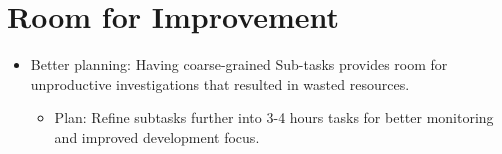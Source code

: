 \documentclass{article}
\begin{document}
\section*{Room for Improvement}

\begin{itemize}
   \item Better planning: Having coarse-grained Sub-tasks provides room for unproductive investigations that resulted in wasted resources.
      \begin{itemize}
         \item Plan: Refine subtasks further into 3-4 hours tasks for better monitoring and improved development focus. 
      \end{itemize}
\end{itemize}
\end{document}
